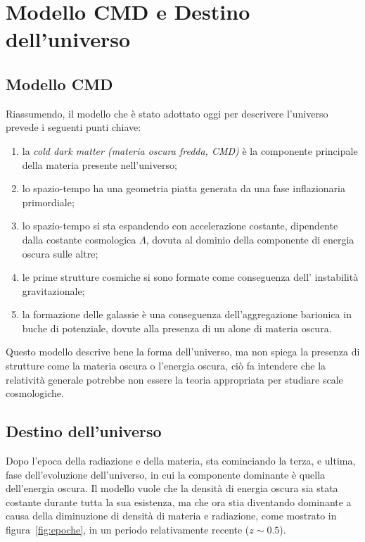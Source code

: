 \section{Modello CMD e Destino dell'universo}\label{sec:modello-CDM-destino}

\subsection{Modello CMD}\label{sec:modello-CDM}
Riassumendo, il modello che è stato adottato oggi per descrivere l'universo prevede i seguenti punti chiave:
\begin{enumerate}
    \item la \textit{cold dark matter (materia oscura fredda, CMD)} è la componente principale della materia presente nell'universo;
    \item lo spazio-tempo ha una geometria piatta generata da una fase inflazionaria primordiale;
    \item lo spazio-tempo si sta espandendo con accelerazione costante, dipendente dalla costante cosmologica $\Lambda$, dovuta al dominio della componente di energia oscura sulle altre;
    \item le prime strutture cosmiche si sono formate come conseguenza dell' instabilità gravitazionale;
    \item la formazione delle galassie è una conseguenza dell'aggregazione barionica in buche di potenziale, dovute alla presenza di un alone di materia oscura.
\end{enumerate}

Questo modello descrive bene la forma dell'universo, ma non spiega la presenza di strutture come la materia oscura o l'energia oscura, ciò fa intendere che la relatività generale potrebbe non essere la teoria appropriata per studiare scale cosmologiche.

\subsection{Destino dell'universo}\label{sec:destino}

Dopo l'epoca della radiazione e della materia, sta cominciando la terza, e ultima, fase dell'evoluzione dell'universo, in cui la componente dominante è quella dell'energia oscura. Il modello vuole che la densità di energia oscura sia stata costante durante tutta la sua esistenza, ma che ora stia diventando dominante a causa della diminuzione di densità di materia e radiazione, come mostrato in figura~\ref{fig:epoche}, in un periodo relativamente recente ($z \sim 0.5$).

